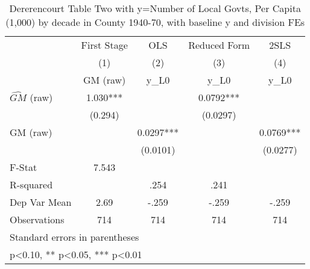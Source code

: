 \begin{table}[htbp]\centering
\def\sym#1{\ifmmode^{#1}\else\(^{#1}\)\fi}
\caption{Dererencourt Table Two with y=Number of Local Govts, Per Capita (1,000) by decade in County 1940-70, with baseline y and division FEs}
\begin{tabular}{l*{4}{c}}
\toprule
                    & First Stage   &         OLS   &Reduced Form   &        2SLS   \\
                    &\multicolumn{1}{c}{(1)}&\multicolumn{1}{c}{(2)}&\multicolumn{1}{c}{(3)}&\multicolumn{1}{c}{(4)}\\
                    &\multicolumn{1}{c}{GM  (raw)}&\multicolumn{1}{c}{y\_L0}&\multicolumn{1}{c}{y\_L0}&\multicolumn{1}{c}{y\_L0}\\
\midrule
$\hat{GM}$ (raw)    &       1.030***&               &      0.0792***&               \\
                    &     (0.294)   &               &    (0.0297)   &               \\
\addlinespace
GM  (raw)           &               &      0.0297***&               &      0.0769***\\
                    &               &    (0.0101)   &               &    (0.0277)   \\
\midrule
F-Stat              &       7.543   &               &               &               \\
R-squared           &               &        .254   &        .241   &               \\
Dep Var Mean        &        2.69   &       -.259   &       -.259   &       -.259   \\
Observations        &         714   &         714   &         714   &         714   \\
\bottomrule
\multicolumn{5}{l}{\footnotesize Standard errors in parentheses}\\
\multicolumn{5}{l}{\footnotesize * p<0.10, ** p<0.05, *** p<0.01}\\
\end{tabular}
\end{table}

